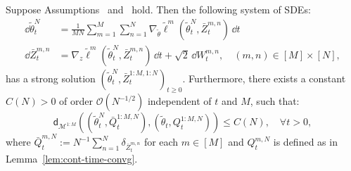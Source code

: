 \begin{lemma}\label{lem:spatial_discretization}
    Suppose Assumptions~ and~ hold. Then the following system of SDEs:
    \begin{align}
        \dd \tilde\theta_t^N &= \frac{1}{MN} \sum_{m=1}^{M} \sum_{n=1}^N \nabla_{\tilde\theta} \tilde{\ell}^m(\tilde\theta_t^N, \bar{Z}_t^{m,n}) \, \dd t \label{eq_app:spatial1} \\
        \dd \bar{Z}_t^{m,n} &= \nabla_{z} \tilde{\ell}^m(\tilde\theta_t^N, \bar{Z}_t^{m,n}) \, \dd t + \sqrt{2} \, \dd W_t^{m,n}, \quad (m,n)\in[M]\times [N], \label{eq_app:spatial3}
    \end{align}
    has a strong solution $(\tilde\theta_t^N, \bar{Z}_t^{1:M, 1:N})_{t \geq 0}$. Furthermore, there exists a constant $C(N)>0$ of order $\mathcal{O}(N^{-1/2})$ independent of $t$ and $M$, such that:
    \begin{equation*}
        \mathsf{d}_{\mathcal{M}^{1:M}}((\tilde\theta_t^N, \bar{Q}_t^{1:M, N}), (\tilde\theta_t, Q_t^{1:M,N})) \leq C(N), \quad \forall t>0,
    \end{equation*}
    where $\bar{Q}_t^{m, N}:=N^{-1}\sum_{n=1}^N \delta_{\bar{Z}_t^{m,n}}$ for each $m\in [M]$ and $Q_t^{m,N}$ is defined as in Lemma~\ref{lem:cont-time-convg}.
\end{lemma}
